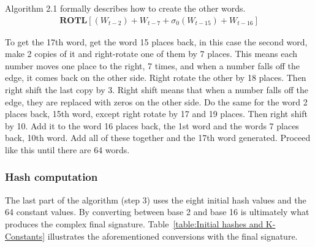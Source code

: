         
        Algorithm 2.1 formally describes how to create the other words. 
        \begin{gather}
             \textbf{ROTL} [(W_{t-2}) + W_{t-7} + \sigma_0(W_{t-15}) + W_{t-16}]
        \end{gather}
        
        
        To get the 17th word, get the word 15 places back, in this case the second word, make 2 copies of it and right-rotate one of them by 7 places. This means each number moves one place to the right, 7 times, and when a number falls off the edge, it comes back on the other side. Right rotate the other by 18 places. Then right shift the last copy by 3. Right shift means that when a number falls off the edge, they are replaced with zeros on the other side. Do the same for the word 2 places back, 15th word, except right rotate by 17 and 19 places. Then right shift by 10. Add it to the word 16 places back, the 1st word and the words 7 places back, 10th word. Add all of these together and the 17th word generated. Proceed like this until there are 64 words. 
        
        \subsubsection{ Hash computation}
        
        The last part of the algorithm (step 3) uses the eight initial hash values and the 64 constant values. By converting between base 2 and base 16 is ultimately what produces the complex final signature. Table~\ref{table:Initial hashes and K-Constants} illustrates the aforementioned conversions with the final signature.
        
        
            
